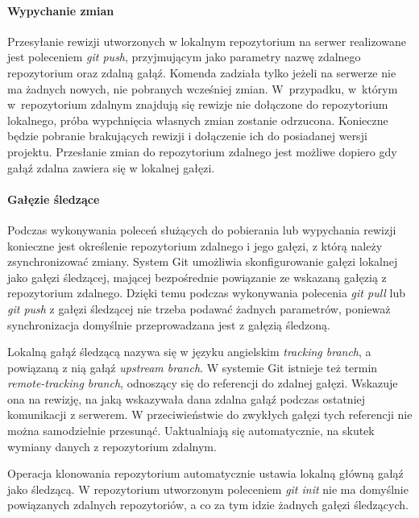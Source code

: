 \documentclass[11pt,a4paper,polish,thesis]{dcsbook}
\begin{document}
	\paragraph{Wypychanie zmian}
	Przesyłanie rewizji utworzonych w lokalnym repozytorium na serwer realizowane jest poleceniem \textit{git push}, przyjmującym jako parametry nazwę zdalnego repozytorium oraz zdalną gałąź. Komenda zadziała tylko jeżeli na serwerze nie ma żadnych nowych, nie pobranych wcześniej zmian. W~przypadku, w~którym w~repozytorium zdalnym znajdują się rewizje nie dołączone do repozytorium lokalnego, próba wypchnięcia własnych zmian zostanie odrzucona. Konieczne będzie pobranie brakujących rewizji i dołączenie ich do posiadanej wersji projektu. Przesłanie zmian do repozytorium zdalnego jest możliwe dopiero gdy gałąź zdalna zawiera się w lokalnej gałęzi.

	\paragraph{Gałęzie śledzące}
	Podczas wykonywania poleceń służących do pobierania lub wypychania rewizji konieczne jest określenie repozytorium zdalnego i jego gałęzi, z którą należy zsynchronizować zmiany. System Git umożliwia skonfigurowanie gałęzi lokalnej jako gałęzi śledzącej, mającej bezpośrednie powiązanie ze wskazaną gałęzią z repozytorium zdalnego. Dzięki temu podczas wykonywania polecenia \textit{git pull} lub \textit{git push} z gałęzi śledzącej nie trzeba podawać żadnych parametrów, ponieważ synchronizacja domyślnie przeprowadzana jest z gałęzią śledzoną.

	Lokalną gałąź śledzącą nazywa się w języku angielskim \textit{tracking branch}, a powiązaną z nią gałąź \textit{upstream branch}. W systemie Git istnieje też termin \textit{remote-tracking branch}, odnoszący się do referencji do zdalnej gałęzi. Wskazuje ona na rewizję, na jaką wskazywała dana zdalna gałąź podczas ostatniej komunikacji z serwerem. W przeciwieństwie do zwykłych gałęzi tych referencji nie można samodzielnie przesunąć. Uaktualniają się automatycznie, na skutek wymiany danych z repozytorium zdalnym.

	Operacja klonowania repozytorium automatycznie ustawia lokalną główną gałąź jako śledzącą. W repozytorium utworzonym poleceniem \textit{git init} nie ma domyślnie powiązanych zdalnych repozytoriów, a co za tym idzie żadnych gałęzi śledzących.

\end{document}
